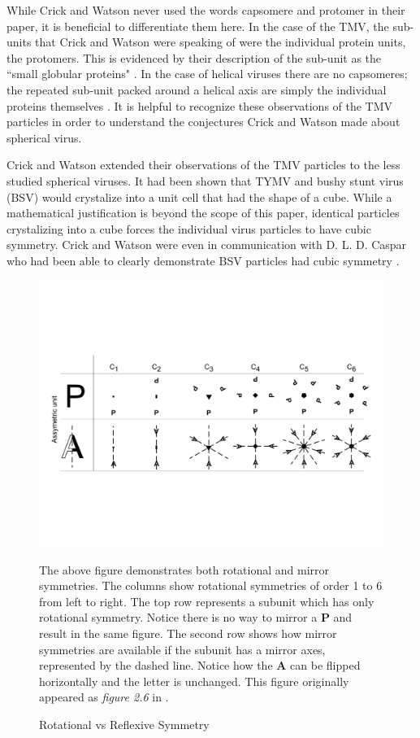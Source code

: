 \documentclass[12pt,letter]{article}
\begin{document}
While Crick and Watson never used the words capsomere and protomer in their paper, it is beneficial to differentiate them here. In the case of the TMV, the sub-units that Crick and Watson were speaking of were the individual protein units, the protomers. This is evidenced by their description of the sub-unit as the ``small globular proteins" \cite[p 473]{Crick:1956}. In the case of helical viruses there are no capsomeres; the repeated sub-unit packed around a helical axis are simply the individual proteins themselves \cite[p 474]{Crick:1956}. It is helpful to recognize these observations of the TMV particles in order to understand the conjectures Crick and Watson made about spherical virus.

Crick and Watson extended their observations of the TMV particles to the less studied spherical viruses. It had been shown that TYMV and bushy stunt virus (BSV) would crystalize into a unit cell that had the shape of a cube. While a mathematical justification is beyond the scope of this paper, identical particles crystalizing into a cube forces the individual virus particles to have cubic symmetry. Crick and Watson were even in communication with D. L. D. Caspar who had been able to clearly demonstrate BSV particles had cubic symmetry \cite[p 474]{Crick:1956}. 

\begin{figure}[t!]
	\caption{Rotational vs Reflexive Symmetry}
	\centering
	\includegraphics[width = .95\textwidth]{symmetry_examples.pdf}
	\label{fig:reflect}
	\begin{minipage}[h]{.85\textwidth}
		\begin{footnotesize}
			The above figure demonstrates both rotational and mirror symmetries. The columns show rotational symmetries of order 1 to 6 from left to right. The top row represents a subunit which has only rotational symmetry. Notice there is no way to mirror a \textbf{P} and result in the same figure. The second row shows how mirror symmetries are available if the subunit has a mirror axes, represented by the dashed line. Notice how the \textbf{A} can be flipped horizontally and the letter is unchanged. This figure originally appeared as \textit{figure 2.6} in \cite{Mannige:Thesis}.
		\end{footnotesize}
	\end{minipage}
\end{figure}
\end{document}

